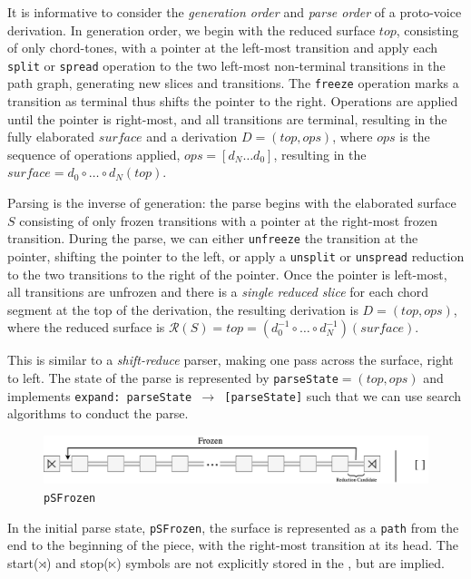 \documentclass[12pt,a4paper,twoside,openany]{report} \usepackage[pdfborder={0 0 0}]{hyperref}    %
\theoremstyle{definition} \newtheorem{definition}{Definition}[section]
\begin{document}
      It is informative to consider the \textit{generation order} and \textit{parse order} of a proto-voice derivation.
      In generation order, we begin with the reduced surface $top$, consisting of only chord-tones, with a pointer at
      the left-most transition and apply each \texttt{split} or \texttt{spread} operation to the two left-most
      non-terminal transitions in the path graph, generating new slices and transitions. The \texttt{freeze} operation
      marks a transition as terminal thus shifts the pointer to the right. Operations are applied until the pointer is
      right-most, and all transitions are terminal, resulting in the fully elaborated $surface$ and a derivation
      $D=(top, ops)$, where $ops$ is the sequence of operations applied, $ops = [d_N \dots d_0]$, resulting in the
      $surface = d_0 \circ \dots \circ d_N (top) $.

      Parsing is the inverse of generation: the parse begins with the elaborated surface $S$ consisting of only frozen
      transitions with a pointer at the right-most frozen transition. During the parse, we can either \texttt{unfreeze}
      the transition at the pointer, shifting the pointer to the left, or apply a \texttt{unsplit} or \texttt{unspread}
      reduction to the two transitions to the right of the pointer. Once the pointer is left-most, all transitions are
      unfrozen and there is a \textit{single reduced slice} for each chord segment at the top of the derivation, the
      resulting derivation is $D = (top, ops)$, where the reduced surface is $\mathcal{R}(S)= top = (d_0^{-1} \circ \dots \circ
      d_N^{-1}) (surface)$.

      This is similar to a \textit{shift-reduce} parser, making one pass across the surface, right to left. The state of
      the parse is represented by \texttt{parseState}$= (top, ops)$ and implements \texttt{expand: parseState $\to$
      [parseState]} such that we can use search algorithms to conduct the parse.

      \begin{figure}[h] \centering\includegraphics[width=\textwidth]{impl/parseState/frozen.png}
      \caption{\texttt{pSFrozen}} \label{fig:pSFrozen} \end{figure}

      In the initial parse state, \texttt{pSFrozen}, the surface is represented as a \texttt{path} from the end to the
      beginning of the piece, with the right-most transition at its head. The start($\rtimes$) and stop($\ltimes$)
      symbols are not explicitly stored in the , but are implied.
\end{document}
